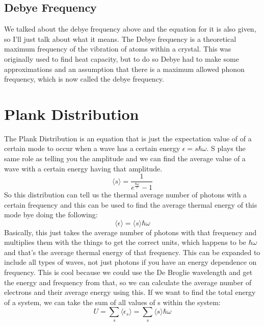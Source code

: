 \documentclass[arial]{article}
\begin{document}
\subsection*{Debye Frequency}
We talked about the debye frequency above and the equation for it is also given, so I'll just talk about what it means. The Debye frequency is a theoretical maximum frequency of the vibration of atoms within a crystal. This was originally used to find heat capacity, but to do so Debye had to make some approximations and an assumption that there is a maximum allowed phonon frequency, which is now called the debye frequency.

\section*{Plank Distribution}
The Plank Distribution is an equation that is just the expectation value of of a certain mode to occur when a wave has a certain energy $\epsilon=s\hbar\omega$. S plays the same role as telling you the amplitude and we can find the average value of a wave with a certain energy having that amplitude.
\begin{equation}
\langle s \rangle =\frac{1}{e^{\frac{\hbar \omega}{\tau}}-1}
\end{equation}
So this distribution can tell us the thermal average number of photons with a certain frequency and this can be used to find the average thermal energy of this mode bye doing the following:
\begin{equation}
\langle \epsilon \rangle = \langle s \rangle \hbar \omega
\end{equation}
Basically, this just takes the average number of photons with that frequency and multiplies them with the things to get the correct units, which happens to be $\hbar \omega$ and that's the average thermal energy of that frequency. This can be expanded to include all types of waves, not just photons if you have an energy dependence on frequency. This is cool because we could use the De Broglie wavelength and get the energy and frequency from that, so we can calculate the average number of electrons and their average energy using this. If we want to find the total energy of a system, we can take the sum of all values of s within the system:
\begin{equation}
U=\sum_{s} \langle \epsilon_s \rangle = \sum_{s} \langle s \rangle \hbar \omega
\end{equation}
\end{document}
